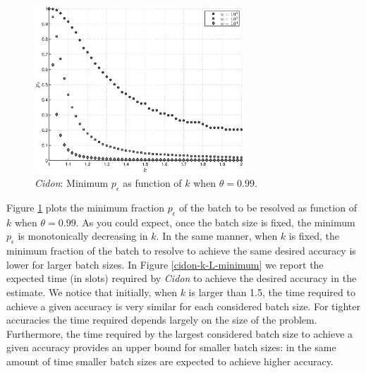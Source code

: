 \documentclass[11pt,a4paper,twoside,openright]{book}
\newcommand{\pc}{p_{\epsilon}}
\begin{document}
\begin{figure}[htbp]
\begin{center}
\includegraphics[width=0.7\textwidth]{matlab/Cidon/cidon-k-p-minimum}
\caption[\emph{Cidon}: Minimum $\pc$ required for accuracy  $k$]{\emph{Cidon}: Minimum $\pc$ as function of $k$ when $\theta=0.99$.}
\label{cidon-k-p-minimum}
\end{center}
\end{figure}

Figure \ref{cidon-k-p-minimum} plots the minimum fraction $\pc$ of the batch to be resolved as function of $k$ when $\theta=0.99$. As you could expect, once the batch size is fixed, the minimum $\pc$ is  monotonically decreasing in $k$. In the same manner, when $k$ is fixed, the minimum fraction of the batch to resolve to achieve the same desired accuracy is lower for larger batch sizes. In Figure \ref{cidon-k-L-minimum} we report the expected time (in slots) required by \emph{Cidon} to achieve the desired accuracy in the estimate.  We notice that initially, when $k$ is larger than 1.5, the time required to achieve a given accuracy is very similar for each considered batch size. For tighter accuracies the time required depends largely on the size of the problem.\\ Furthermore, the time required by the largest considered batch size to achieve a given accuracy provides an upper bound for smaller batch sizes: in the same amount of time smaller batch sizes are expected to achieve higher accuracy.\\
\end{document}
